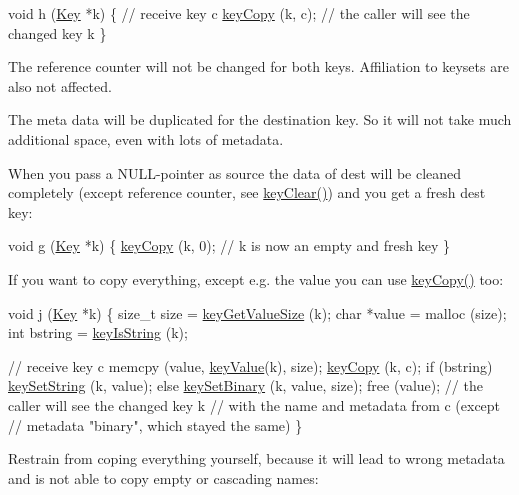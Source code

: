\begin{DoxyCodeInclude}
\textcolor{keywordtype}{void} h (\hyperlink{classkdb_1_1Key_a5679f5cae63caddd64a60388b9cc77fa}{Key} *k)
\{
        \textcolor{comment}{// receive key c}
        \hyperlink{group__key_ga6a12cbbe656a1ad9f41b8c681d7a2f92}{keyCopy} (k, c);
        \textcolor{comment}{// the caller will see the changed key k}
\}
\end{DoxyCodeInclude}
 The reference counter will not be changed for both keys. Affiliation to keysets are also not affected.

The meta data will be duplicated for the destination key. So it will not take much additional space, even with lots of metadata.

When you pass a N\-U\-L\-L-\/pointer as source the data of dest will be cleaned completely (except reference counter, see \hyperlink{group__key_gab2242311a36bbc0520e0d36895107ec1}{key\-Clear()}) and you get a fresh dest key\-:


\begin{DoxyCodeInclude}
\textcolor{keywordtype}{void} g (\hyperlink{classkdb_1_1Key_a5679f5cae63caddd64a60388b9cc77fa}{Key} *k)
\{
        \hyperlink{group__key_ga6a12cbbe656a1ad9f41b8c681d7a2f92}{keyCopy} (k, 0);
        \textcolor{comment}{// k is now an empty and fresh key}
\}
\end{DoxyCodeInclude}
 If you want to copy everything, except e.\-g. the value you can use \hyperlink{group__key_ga6a12cbbe656a1ad9f41b8c681d7a2f92}{key\-Copy()} too\-:


\begin{DoxyCodeInclude}
\textcolor{keywordtype}{void} j (\hyperlink{classkdb_1_1Key_a5679f5cae63caddd64a60388b9cc77fa}{Key} *k)
\{
        \textcolor{keywordtype}{size\_t} size = \hyperlink{group__keyvalue_gae326672fffb7474abfe9baf53b73217e}{keyGetValueSize} (k);
        \textcolor{keywordtype}{char} *value = malloc (size);
        \textcolor{keywordtype}{int} bstring = \hyperlink{group__keytest_gaea7670778abd07fee0fe8ac12a149190}{keyIsString} (k);

        \textcolor{comment}{// receive key c}
        memcpy (value, \hyperlink{group__keyvalue_ga6f29609c5da53c6dc26a98678d5752af}{keyValue}(k), size);
        \hyperlink{group__key_ga6a12cbbe656a1ad9f41b8c681d7a2f92}{keyCopy} (k, c);
        \textcolor{keywordflow}{if} (bstring) \hyperlink{group__keyvalue_ga622bde1eb0e0c4994728331326340ef2}{keySetString} (k, value);
        \textcolor{keywordflow}{else} \hyperlink{group__keyvalue_gaa50a5358fd328d373a45f395fa1b99e7}{keySetBinary} (k, value, size);
        free (value);
        \textcolor{comment}{// the caller will see the changed key k}
        \textcolor{comment}{// with the name and metadata from c (except}
        \textcolor{comment}{// metadata "binary", which stayed the same)}
\}
\end{DoxyCodeInclude}
 Restrain from coping everything yourself, because it will lead to wrong metadata and is not able to copy empty or cascading names\-:



